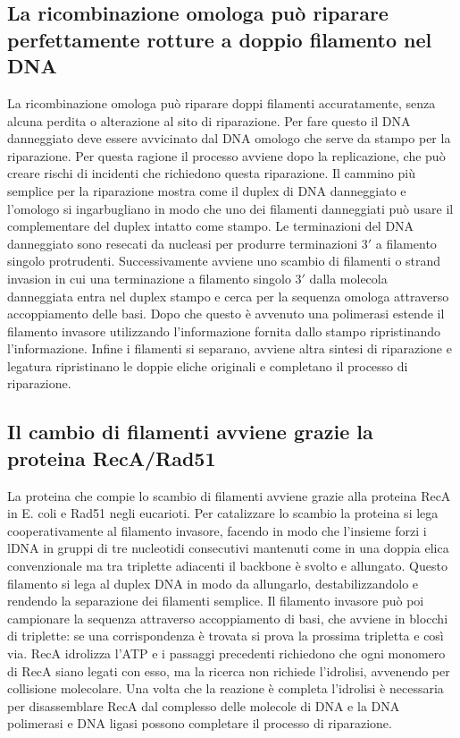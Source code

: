 \subsection{La ricombinazione omologa pu\`o riparare perfettamente rotture a doppio filamento nel DNA}
La ricombinazione omologa pu\`o riparare doppi filamenti accuratamente, senza alcuna perdita o alterazione al sito di riparazione. Per fare questo il DNA danneggiato deve essere 
avvicinato dal DNA omologo che serve da stampo per la riparazione. Per questa ragione il processo avviene dopo la replicazione, che pu\`o creare rischi di incidenti che richiedono questa
riparazione. Il cammino pi\`u semplice per la riparazione mostra come il duplex di DNA danneggiato e l'omologo si ingarbugliano in modo che uno dei filamenti danneggiati pu\`o usare il 
complementare del duplex intatto come stampo. Le terminazioni del DNA danneggiato sono resecati da nucleasi per produrre terminazioni $3'$ a filamento singolo protrudenti. 
Successivamente avviene uno scambio di filamenti o strand invasion in cui una terminazione a filamento singolo $3'$ dalla molecola danneggiata entra nel duplex stampo e cerca per la 
sequenza omologa attraverso accoppiamento delle basi. Dopo che questo \`e avvenuto una polimerasi estende il filamento invasore utilizzando l'informazione fornita dallo stampo 
ripristinando l'informazione. Infine i filamenti si separano, avviene altra sintesi di riparazione e legatura ripristinano le doppie eliche originali e completano il processo di 
riparazione. 
\subsection{Il cambio di filamenti avviene grazie la proteina RecA/Rad51}
La proteina che compie lo scambio di filamenti avviene grazie alla proteina RecA in E. coli e Rad51 negli eucarioti. Per catalizzare lo scambio la proteina si lega cooperativamente
al filamento invasore, facendo in modo che l'insieme forzi i lDNA in gruppi di tre nucleotidi consecutivi mantenuti come in una doppia elica convenzionale ma tra triplette adiacenti
il backbone \`e svolto e allungato. Questo filamento si lega al duplex DNA in modo da allungarlo, destabilizzandolo e rendendo la separazione dei filamenti semplice. Il filamento 
invasore pu\`o poi campionare la sequenza attraverso accoppiamento di basi, che avviene in blocchi di triplette: se una corrispondenza \`e trovata si prova la prossima tripletta e cos\`i
via. RecA idrolizza l'ATP e i passaggi precedenti richiedono che ogni monomero di RecA siano legati con esso, ma la ricerca non richiede l'idrolisi, avvenendo per collisione molecolare.
Una volta che la reazione \`e completa l'idrolisi \`e necessaria per disassemblare RecA dal complesso delle molecole di DNA e la DNA polimerasi e DNA ligasi possono completare il 
processo di riparazione.
